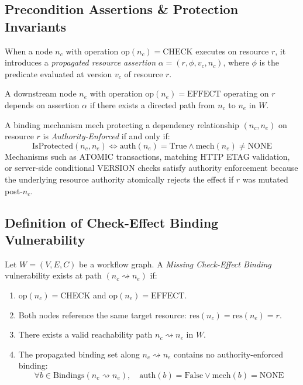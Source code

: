 \subsection{Precondition Assertions \& Protection Invariants}
When a node $n_c$ with operation $\text{op}(n_c) = \text{CHECK}$ executes on resource $r$, it introduces a \emph{propagated resource assertion} $\alpha = (r, \phi, v_c, n_c)$, where $\phi$ is the predicate evaluated at version $v_c$ of resource $r$.

A downstream node $n_e$ with operation $\text{op}(n_e) = \text{EFFECT}$ operating on $r$ depends on assertion $\alpha$ if there exists a directed path from $n_c$ to $n_e$ in $W$.

\begin{definition}
A binding mechanism $\text{mech}$ protecting a dependency relationship $(n_c, n_e)$ on resource $r$ is \emph{Authority-Enforced} if and only if:
\begin{equation}
    \text{IsProtected}(n_c, n_e) \iff \text{auth}(n_e) = \text{True} \land \text{mech}(n_e) \neq \text{NONE}
\end{equation}
Mechanisms such as \textsf{ATOMIC} transactions, matching HTTP \textsf{ETAG} validation, or server-side conditional \textsf{VERSION} checks satisfy authority enforcement because the underlying resource authority atomically rejects the effect if $r$ was mutated post-$n_c$.
\end{definition}

\subsection{Definition of Check-Effect Binding Vulnerability}
\begin{definition}
Let $W = (V, E, C)$ be a workflow graph. A \emph{Missing Check-Effect Binding} vulnerability exists at path $(n_c \rightsquigarrow n_e)$ if:
\begin{enumerate}
    \item $\text{op}(n_c) = \text{CHECK}$ and $\text{op}(n_e) = \text{EFFECT}$.
    \item Both nodes reference the same target resource: $\text{res}(n_c) = \text{res}(n_e) = r$.
    \item There exists a valid reachability path $n_c \rightsquigarrow n_e$ in $W$.
    \item The propagated binding set along $n_c \rightsquigarrow n_e$ contains no authority-enforced binding:
    \begin{equation}
        \forall b \in \text{Bindings}(n_c \rightsquigarrow n_e), \quad \text{auth}(b) = \text{False} \lor \text{mech}(b) = \text{NONE}
    \end{equation}
\end{enumerate}
\end{definition}

